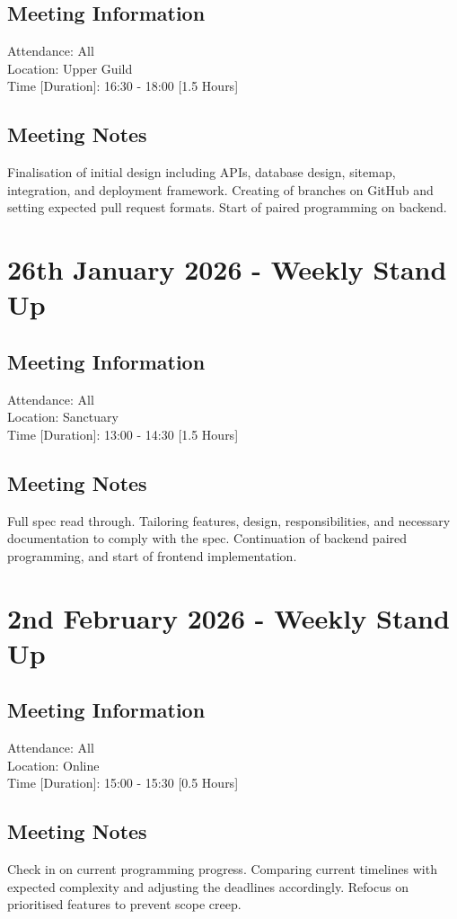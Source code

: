 \documentclass[]{report}
\begin{document}
	\subsection*{Meeting Information}
	Attendance: All\\
	Location: Upper Guild\\
	Time [Duration]: 16:30 - 18:00 [1.5 Hours]
	\subsection*{Meeting Notes}
	Finalisation of initial design including APIs, database design, sitemap, integration, and deployment framework. Creating of branches on GitHub and setting expected pull request formats. Start of paired programming on backend.
	\section*{26th January 2026 - Weekly Stand Up}
	\subsection*{Meeting Information}
	Attendance: All\\
	Location: Sanctuary\\
	Time [Duration]: 13:00 - 14:30 [1.5 Hours]
	\subsection*{Meeting Notes}
	Full spec read through. Tailoring features, design, responsibilities, and necessary documentation to comply with the spec. Continuation of backend paired programming, and start of frontend implementation.
	\section*{2nd February 2026 - Weekly Stand Up}
	\subsection*{Meeting Information}
	Attendance: All\\
	Location: Online\\
	Time [Duration]: 15:00 - 15:30 [0.5 Hours]
	\subsection*{Meeting Notes}
	Check in on current programming progress. Comparing current timelines with expected complexity and adjusting the deadlines accordingly. Refocus on prioritised features to prevent scope creep.
\end{document}
